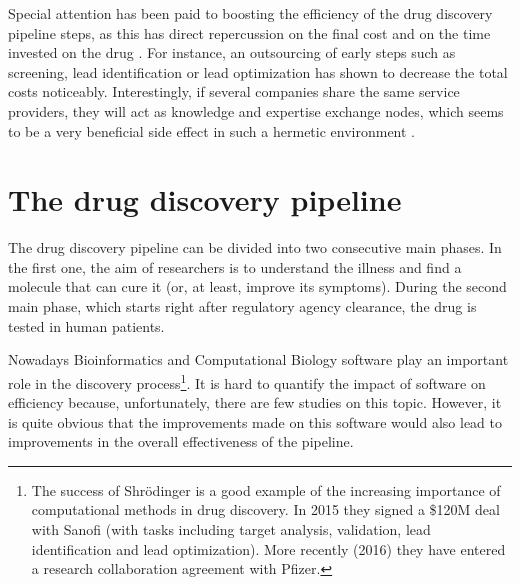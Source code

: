 Special attention has been paid to boosting the efficiency of the drug discovery pipeline steps, as this has direct repercussion on the final cost and on the time invested on the drug . For instance, an outsourcing of early steps such as screening, lead identification or lead optimization has shown to decrease the total costs noticeably. Interestingly, if several companies share the same service providers, they will act as  knowledge and expertise exchange nodes, which seems to be a very beneficial side effect in such a hermetic environment . 

\section{The drug discovery pipeline }

The drug discovery pipeline can be divided into two consecutive main phases. In the first one, the aim of researchers is to understand the illness and find a molecule that can cure it (or, at least, improve its symptoms). During the second main phase, which starts right after regulatory agency clearance, the drug is tested in human patients. 

Nowadays Bioinformatics and Computational Biology software play an important role in the discovery process\footnote{The success of Shr\"{o}dinger is a good example of the increasing importance of computational methods in drug discovery. In 2015 they signed a \$120M deal with Sanofi (with tasks including target analysis, validation, lead identification and lead optimization). More recently (2016) they have entered a research collaboration agreement with Pfizer.}. It is hard to quantify the  impact of software on efficiency because, unfortunately, there are few studies on this topic. However, it is quite obvious that the improvements made on this software would also lead to improvements in the overall effectiveness of the pipeline. 

